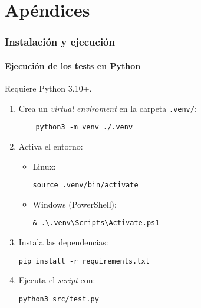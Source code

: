 \part{Apéndices}

\section{Instalación y ejecución}



\subsection*{Ejecución de los tests en Python}
Requiere Python 3.10+.
\begin{enumerate}
  \item Crea un \textit{virtual enviroment} en la carpeta \texttt{.venv/}:
  \begin{verbatim}
    python3 -m venv ./.venv
  \end{verbatim}
  \item Activa el entorno:
  \begin{itemize}
    \item Linux:
    \begin{verbatim}
source .venv/bin/activate
    \end{verbatim}
    \item Windows (PowerShell):
    \begin{verbatim}
& .\.venv\Scripts\Activate.ps1
    \end{verbatim}
  \end{itemize}
  \item Instala las dependencias:
  \begin{verbatim}
pip install -r requirements.txt
  \end{verbatim}
  \item Ejecuta el \textit{script} con:
  \begin{verbatim}
python3 src/test.py
  \end{verbatim}
\end{enumerate}
